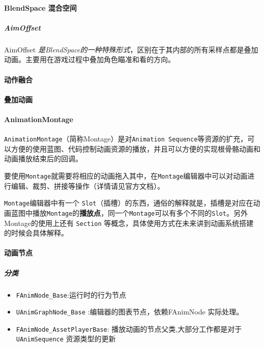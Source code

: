 \documentclass[UTF8,a4paper,12pt]{ctexbook}
\begin{document}
			\paragraph{BlendSpace 混合空间}
				
					\subparagraph{AimOffset}
								AimOffset\textit{ 是BlendSpace的一种特殊形式}，区别在于其内部的所有采样点都是叠加动画。主要用在游戏过程中叠加角色瞄准和看的方向。
			
			\paragraph{动作融合}
			
			
			\paragraph{叠加动画}
			
			
			\paragraph{AnimationMontage}
				\verb|AnimationMontage|（简称Montage）是对\verb|Animation Sequence|等资源的扩充，可以方便的使用蓝图、代码控制动画资源的播放，并且可以方便的实现根骨骼动画和动画播放结束后的回调。
				
				要使用\verb|Montage|就需要将相应的动画拖入其中，在\verb|Montage|编辑器中可以对动画进行编辑、裁剪、拼接等操作（详情请见官方文档）。
				
				\verb|Montage|编辑器中有一个 \verb|Slot|（插槽）的东西，通俗的解释就是，插槽是对应在动画蓝图中播放\verb|Montage|的\textbf{播放点}，同一个\verb|Montage|可以有多个不同的\verb|Slot|。另外Montage的使用上还有 \verb|Section| 等概念，具体使用方式在未来讲到动画系统搭建的时候会具体解释。
			
			
			
			\paragraph{动画节点}
				
				\subparagraph{分类}
					
					\begin{itemize}
						\item \verb|FAnimNode_Base|:{运行时的行为节点}
						\item \verb|UAnimGraphNode_Base| :{编辑器的图表节点}，依赖FAnimNode 实际处理。
						\item \verb|FAnimNode_AssetPlayerBase|: 播放动画的节点父类,大部分工作都是对于\verb|UAnimSequence| 资源类型的更新
					\end{itemize}
					
\end{document}
